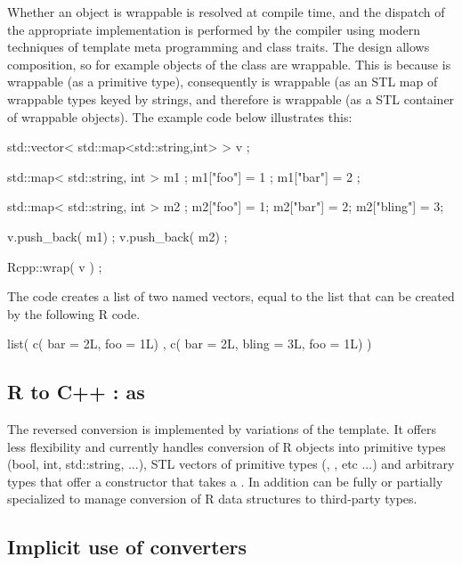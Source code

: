 Whether an object is wrappable is resolved at compile time, and the 
dispatch of the appropriate implementation is performed by the compiler
using modern techniques of template meta programming and class traits.
The design allows composition, so for example objects of the class
 are wrappable. This is 
because  is wrappable (as a primitive type), consequently 
 is wrappable (as an STL map of 
wrappable types keyed by strings, and therefore
 is wrappable (as a 
STL container of wrappable objects). The example code below
illustrates this: 

\begin{example}
std::vector< std::map<std::string,int> > v ;

std::map< std::string, int > m1 ;
m1["foo"] = 1 ; m1["bar"] = 2 ;

std::map< std::string, int > m2 ;
m2["foo"] = 1; m2["bar"] = 2; m2["bling"] = 3;

v.push_back( m1) ;
v.push_back( m2) ;

Rcpp::wrap( v ) ;
\end{example}

The code creates a list of two named vectors, equal to the list that 
can be created by the following R code. 

\begin{example}
list( c( bar = 2L, foo = 1L) , 
      c( bar = 2L, bling = 3L, foo = 1L) )
\end{example}

\subsection{R to C++ : as}

The reversed conversion is implemented by variations of the 
 template. It offers less flexibility and currently
handles conversion of R objects into primitive types (bool, int, std::string, ...), 
STL vectors of primitive types  (, 
, etc ...) and arbitrary types that offer 
a constructor that takes a . In addition  can 
be fully or partially specialized to manage conversion of R data 
structures to third-party types.

\subsection{Implicit use of converters}

